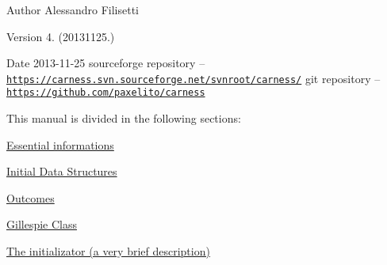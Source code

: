 \begin{DoxyAuthor}{Author}
Alessandro Filisetti 
\end{DoxyAuthor}
\begin{DoxyVersion}{Version}
4. (20131125.) 
\end{DoxyVersion}
\begin{DoxyDate}{Date}
2013-\/11-\/25 sourceforge repository -- \href{https://carness.svn.sourceforge.net/svnroot/carness/}{\tt https\+://carness.\+svn.\+sourceforge.\+net/svnroot/carness/} git repository -- \href{https://github.com/paxelito/carness}{\tt https\+://github.\+com/paxelito/carness}
\end{DoxyDate}
This manual is divided in the following sections\+:
\begin{DoxyItemize}
\item \hyperlink{intro}{Essential informations}
\item \hyperlink{pageInitStr}{Initial Data Structures}
\item \hyperlink{pageoutcomes}{Outcomes}
\item \hyperlink{pageGillespie}{Gillespie Class}
\item \hyperlink{pageInitializator}{The initializator (a very brief description)} 
\end{DoxyItemize}